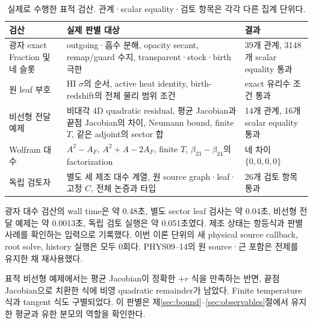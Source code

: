 \begin{table}[H]
\centering\small
\begin{tabularx}{\textwidth}{@{}p{31mm}X p{35mm}@{}}
\toprule
검산 & 실제 판별 대상 & 결과\\
\midrule
광자 exact Fraction 및 네 슬롯 & outgoing·흡수 분해, opacity secant, remap/guard 수지, transparent·stock·birth 극한 & 39개 관계, 3148개 scalar equality 통과\\
원 leaf 부호 & HI $\sigma$의 순서, active heat identity, birth-redshift의 전체 물리 범위 조건 & exact 유리수 조건 통과\\
비선형 전달 예제 & 비대각 4D quadratic residual, 평균 Jacobian과 끝점 Jacobian의 차이, Neumann bound, finite $T$, 같은 adjoint의 sector 합 & 14개 관계, 16개 scalar equality 통과\\
Wolfram 대수 & $A^2-A_F$, $A^2+A-2A_F$, finite $T$, $\beta_{23}-\beta_{24}$의 factorization & 네 차이 $\{0,0,0,0\}$\\
독립 검토자 & 별도 세 제조 대수 계열, 원 source graph·leaf·고정 $C$, 전체 논증과 타입 & 26개 검토 항목 통과\\
\bottomrule
\end{tabularx}
\caption{실제로 수행한 표적 검산. 관계·scalar equality·검토 항목은 각각 다른 집계 단위다.}
\label{tab:checks}
\end{table}
광자 대수 검산의 wall time은 약 0.48초, 별도 sector leaf 검사는 약 0.04초,
비선형 전달 예제는 약 0.0013초, 독립 검토 실행은 약 0.051초였다.
제조 상태는 항등식과 판별 사례를 확인하는 입력으로 기록했다.
이번 이론 단위의 새 physical source callback, root solve, history 실행은 모두 0회다.
PHYS09--14의 원 source·근 포함은 전제를 유지한 채 재사용했다.\cite{checks,review}

표적 비선형 예제에서는 평균 Jacobian이 정확한 $+r$ 식을 만족하는 반면,
끝점 Jacobian으로 치환한 식에 비영 quadratic remainder가 남았다.
Finite temperature 식과 tangent 식도 구별되었다.
이 판별은 제\ref{sec:bound}--\ref{sec:observables}절에서 유지한 평균과 유한 분모의 역할을 확인한다.

